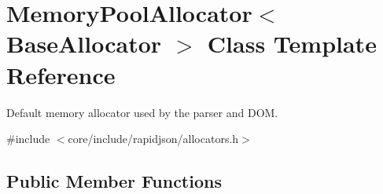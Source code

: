 \hypertarget{classMemoryPoolAllocator}{}\section{Memory\+Pool\+Allocator$<$ Base\+Allocator $>$ Class Template Reference}
\label{classMemoryPoolAllocator}


Default memory allocator used by the parser and D\+OM.  




{\ttfamily \#include $<$core/include/rapidjson/allocators.\+h$>$}

\subsection*{Public Member Functions}
